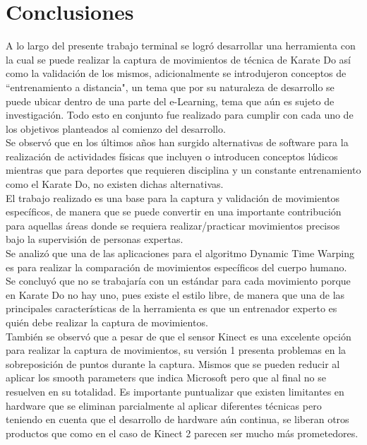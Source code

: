 \chapter{Conclusiones}

A lo largo del presente trabajo terminal  se logró desarrollar una herramienta con la cual se puede realizar la captura de movimientos de técnica de Karate Do así como la validación de los mismos, adicionalmente se introdujeron conceptos de ``entrenamiento a distancia", un tema que por su naturaleza de desarrollo se puede ubicar dentro de una parte del e-Learning, tema que aún es sujeto de investigación. Todo esto en conjunto fue realizado para cumplir con cada uno de los objetivos planteados al comienzo del desarrollo.\\

Se observó que en los últimos años han surgido alternativas de software para la realización de actividades físicas que incluyen o introducen conceptos lúdicos mientras que para deportes que requieren disciplina y un constante entrenamiento como el Karate Do, no existen dichas alternativas.\\

El trabajo realizado es una base para la captura y validación de movimientos específicos, de manera que se puede convertir en una importante contribución para aquellas áreas donde se requiera realizar/practicar movimientos precisos bajo la supervisión de personas expertas.\\

Se analizó que una de las aplicaciones para el algoritmo Dynamic Time Warping es para realizar la comparación de movimientos específicos del cuerpo humano.\\

Se concluyó que no se trabajaría con un estándar para cada movimiento porque en Karate Do no hay uno, pues existe el estilo libre, de manera que una de las principales características de la herramienta es que un entrenador experto es quién debe realizar la captura de movimientos.\\

También se observó que a pesar de que el sensor Kinect es una excelente opción para realizar la captura de movimientos, su versión 1 presenta problemas en la sobreposición de puntos durante la captura. Mismos que se pueden reducir al aplicar los smooth parameters que indica Microsoft pero que al final no se resuelven en su totalidad. Es importante puntualizar que existen limitantes en hardware que se eliminan parcialmente al aplicar diferentes técnicas pero teniendo en cuenta que el desarrollo de hardware aún continua, se liberan otros productos que como en el caso de Kinect 2 parecen ser mucho más prometedores.\\

